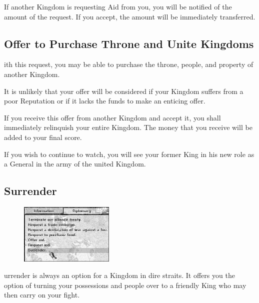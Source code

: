 If another Kingdom is requesting Aid from you, you will be notified of the amount of the request. If you accept, the amount will be immediately transferred.

\subsection{Offer to Purchase Throne and Unite Kingdoms}


ith this request, you may be able to purchase the throne, people, and property of another Kingdom.

It is unlikely that your offer will be considered if your Kingdom suffers from a poor Reputation or if it lacks the funds to make an enticing offer.

If you receive this offer from another Kingdom and accept it, you shall immediately relinquish your entire Kingdom. The money that you receive will be added to your final score.

If you wish to continue to watch, you will see your former King in his new role as a General in the army of the united Kingdom.

\clearpage

\subsection{Surrender}


\begin{figure}
	\vspace{-20pt}
	\begin{center}
		\includegraphics[width=0.4\textwidth]{Idimplomacy_surrender}
	\end{center}
	\vspace{-20pt}
\end{figure}

urrender is always an option for a Kingdom in dire straits. It offers you the option of turning your possessions and people over to a friendly King who may then carry on your fight.

